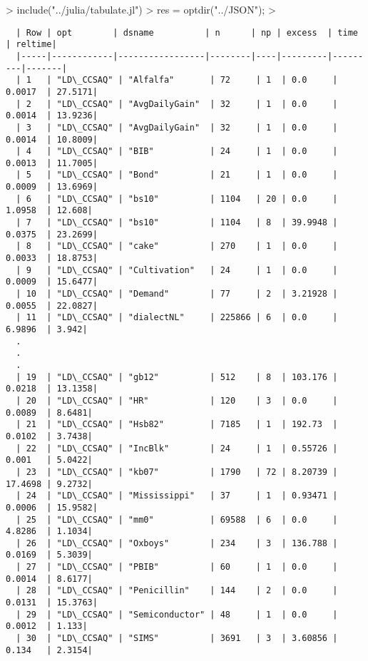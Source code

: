 \documentclass[article]{jss}
\begin{document}
\begin{Schunk}
\begin{Sinput}
> include("../julia/tabulate.jl")
> res = optdir("../JSON");
> 
\end{Sinput}
\end{Schunk}



\begin{verbatim}
  | Row | opt        | dsname          | n      | np | excess  | time    | reltime|    
  |-----|------------|-----------------|--------|----|---------|---------|-------|
  | 1   | "LD\_CCSAQ" | "Alfalfa"       | 72     | 1  | 0.0     | 0.0017  | 27.5171|
  | 2   | "LD\_CCSAQ" | "AvgDailyGain"  | 32     | 1  | 0.0     | 0.0014  | 13.9236|
  | 3   | "LD\_CCSAQ" | "AvgDailyGain"  | 32     | 1  | 0.0     | 0.0014  | 10.8009|
  | 4   | "LD\_CCSAQ" | "BIB"           | 24     | 1  | 0.0     | 0.0013  | 11.7005|
  | 5   | "LD\_CCSAQ" | "Bond"          | 21     | 1  | 0.0     | 0.0009  | 13.6969|
  | 6   | "LD\_CCSAQ" | "bs10"          | 1104   | 20 | 0.0     | 1.0958  | 12.608|
  | 7   | "LD\_CCSAQ" | "bs10"          | 1104   | 8  | 39.9948 | 0.0375  | 23.2699|
  | 8   | "LD\_CCSAQ" | "cake"          | 270    | 1  | 0.0     | 0.0033  | 18.8753|
  | 9   | "LD\_CCSAQ" | "Cultivation"   | 24     | 1  | 0.0     | 0.0009  | 15.6477|
  | 10  | "LD\_CCSAQ" | "Demand"        | 77     | 2  | 3.21928 | 0.0055  | 22.0827|
  | 11  | "LD\_CCSAQ" | "dialectNL"     | 225866 | 6  | 0.0     | 6.9896  | 3.942|
  .
  .
  .
  | 19  | "LD\_CCSAQ" | "gb12"          | 512    | 8  | 103.176 | 0.0218  | 13.1358|
  | 20  | "LD\_CCSAQ" | "HR"            | 120    | 3  | 0.0     | 0.0089  | 8.6481|
  | 21  | "LD\_CCSAQ" | "Hsb82"         | 7185   | 1  | 192.73  | 0.0102  | 3.7438|
  | 22  | "LD\_CCSAQ" | "IncBlk"        | 24     | 1  | 0.55726 | 0.001   | 5.0422|
  | 23  | "LD\_CCSAQ" | "kb07"          | 1790   | 72 | 8.20739 | 17.4698 | 9.2732|
  | 24  | "LD\_CCSAQ" | "Mississippi"   | 37     | 1  | 0.93471 | 0.0006  | 15.9582|
  | 25  | "LD\_CCSAQ" | "mm0"           | 69588  | 6  | 0.0     | 4.8286  | 1.1034|
  | 26  | "LD\_CCSAQ" | "Oxboys"        | 234    | 3  | 136.788 | 0.0169  | 5.3039|
  | 27  | "LD\_CCSAQ" | "PBIB"          | 60     | 1  | 0.0     | 0.0014  | 8.6177|
  | 28  | "LD\_CCSAQ" | "Penicillin"    | 144    | 2  | 0.0     | 0.0131  | 15.3763|
  | 29  | "LD\_CCSAQ" | "Semiconductor" | 48     | 1  | 0.0     | 0.0012  | 1.133|
  | 30  | "LD\_CCSAQ" | "SIMS"          | 3691   | 3  | 3.60856 | 0.134   | 2.3154|
  
\end{verbatim}
\end{document}
